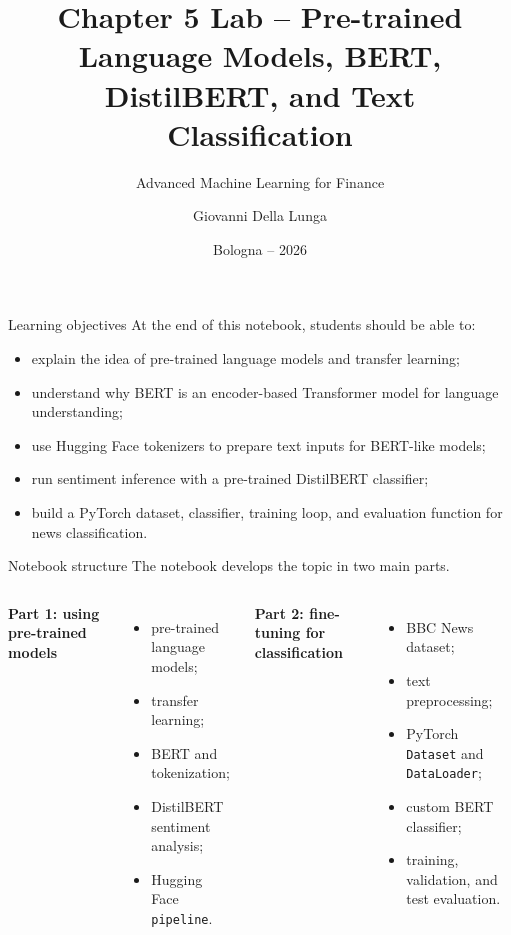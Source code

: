 \documentclass[aspectratio=169]{beamer}
\title[]{Chapter 5 Lab -- Pre-trained Language Models, BERT, DistilBERT, and Text Classification}
\subtitle{Advanced Machine Learning for Finance}
\author{Giovanni Della Lunga}
\institute{Master's Degree in Quantitative Finance -- University of Bologna}
\date{Bologna -- 2026}
\begin{document}

\begin{frame}
    \titlepage
\end{frame}

\begin{frame}{Learning objectives}
At the end of this notebook, students should be able to:
\begin{itemize}
    \item explain the idea of pre-trained language models and transfer learning;
    \item understand why BERT is an encoder-based Transformer model for language understanding;
    \item use Hugging Face tokenizers to prepare text inputs for BERT-like models;
    \item run sentiment inference with a pre-trained DistilBERT classifier;
    \item build a PyTorch dataset, classifier, training loop, and evaluation function for news classification.
\end{itemize}
\end{frame}

\begin{frame}{Notebook structure}
The notebook develops the topic in two main parts.

\vspace{0.3cm}

\begin{columns}
\textbf{Part 1: using pre-trained models}
\begin{itemize}
    \item pre-trained language models;
    \item transfer learning;
    \item BERT and tokenization;
    \item DistilBERT sentiment analysis;
    \item Hugging Face \texttt{pipeline}.
\end{itemize}

\textbf{Part 2: fine-tuning for classification}
\begin{itemize}
    \item BBC News dataset;
    \item text preprocessing;
    \item PyTorch \texttt{Dataset} and \texttt{DataLoader};
    \item custom BERT classifier;
    \item training, validation, and test evaluation.
\end{itemize}
\end{columns}
\end{frame}
\end{document}
